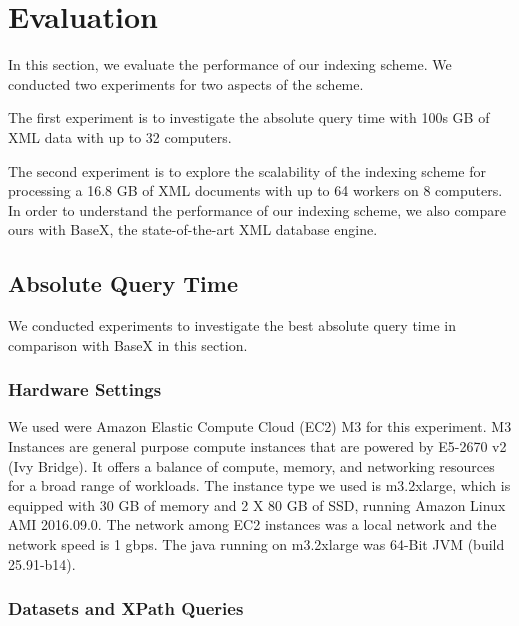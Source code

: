 \section{Evaluation}
\label{sec:evaluation}

In this section, we evaluate the performance of our indexing scheme. We
conducted two  experiments for two aspects of the scheme.

The first experiment is to investigate the absolute query time with 100s GB of
XML data  with up to 32 computers.  

The second experiment is to explore the scalability of the indexing scheme for
processing a 16.8 GB of XML documents with up to 64 workers on 8 computers.
In order to understand the performance of our indexing scheme, we also compare
ours with BaseX,  the state-of-the-art XML database engine.


\subsection{Absolute Query Time} 

We conducted experiments to investigate the best absolute query time in
comparison with BaseX in this section.

\subsubsection{Hardware Settings}

We used were Amazon Elastic Compute Cloud (EC2) M3 for this experiment. M3
Instances are general purpose compute instances that are powered by E5-2670 v2
(Ivy Bridge). It offers a balance of compute, memory, and networking resources
for a broad range of workloads. The instance type we used is m3.2xlarge, which
is equipped with 30 GB of memory and 2 X 80 GB of SSD, running Amazon Linux AMI
2016.09.0. The network among EC2 instances was a local network and the network
speed is 1 gbps. The java running on m3.2xlarge was 64-Bit JVM (build
25.91-b14).



\subsubsection{Datasets and XPath Queries}

